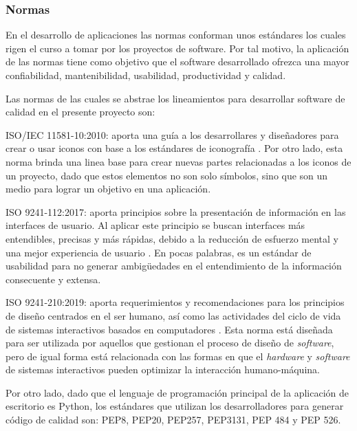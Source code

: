 \subsubsection{Normas}
En el desarrollo de aplicaciones las normas conforman unos estándares los cuales rigen el curso a tomar por los proyectos de software. Por tal motivo, la aplicación de las normas tiene como objetivo que el software desarrollado ofrezca una mayor confiabilidad, mantenibilidad, usabilidad, productividad y calidad. 

Las normas de las cuales se abstrae los lineamientos para desarrollar software de calidad en el presente proyecto son:

\begin{APAitemize}
    \item ISO/IEC 11581-10:2010: aporta una guía a los desarrollares y diseñadores para crear o usar iconos con base a los estándares de iconografía \parencite{Iso11581}. Por otro lado, esta norma brinda una linea base para crear nuevas partes relacionadas a los iconos de un proyecto, dado que estos elementos no son solo símbolos, sino que son un medio para lograr un objetivo en una aplicación.
    \item ISO 9241-112:2017: aporta principios sobre la presentación de información en las interfaces de usuario. Al aplicar este principio se buscan interfaces más entendibles, precisas y  más rápidas, debido a la reducción de esfuerzo mental y una mejor experiencia de usuario \parencite{Iso9241-112}. En pocas palabras, es un estándar de usabilidad para no generar ambigüedades en el entendimiento de la información consecuente y extensa.
    \item ISO 9241-210:2019: aporta requerimientos y recomendaciones para los principios de diseño centrados en el ser humano, así como las actividades del ciclo de vida de sistemas interactivos basados en computadores \parencite{Iso9241-210}. Esta norma está diseñada para ser utilizada por aquellos que gestionan el proceso de diseño de \textit{software}, pero de igual forma está relacionada con las formas en que el \textit{hardware} y \textit{software} de sistemas interactivos pueden optimizar la interacción humano-máquina.
\end{APAitemize}

Por otro lado, dado que el lenguaje de programación principal de la aplicación de escritorio es Python, los estándares que utilizan los desarrolladores para generar código de calidad son: PEP8, PEP20, PEP257, PEP3131, PEP 484 y PEP 526.

